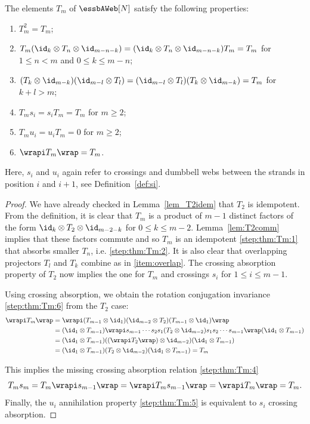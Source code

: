 \begin{theo} \label{thm:Tm}
  The elements $T_m$ of $\essbAWeb[N]$ satisfy the following properties: 
  \begin{enumerate}
  \item $T_m^2=T_m$; \label{step:thm:Tm:1}
  \item $T_m (\id_{k}\otimes T_n\otimes \id_{m-n-k}) =(\id_{k}\otimes T_n\otimes \id_{m-n-k}) T_m = T_m$ for $1\leq n< m$ and $0\leq k\leq m-n$; \label{step:thm:Tm:2}
  \item $(T_k\otimes \id_{m-k})(\id_{m-l}\otimes T_l)= (\id_{m-l}\otimes T_l) (T_k\otimes \id_{m-k})  = T_{m}$ for $k+l> m$; \label{item:overlap} 
\item $T_m s_i= s_i T_m=T_m$ for $m\geq 2$; \label{step:thm:Tm:4}
\item $T_m u_i= u_i T_m=0$ for $m\geq 2$; \label{step:thm:Tm:5}
 \item $\wrapi T_m \wrap=T_m$. \label{step:thm:Tm:6}
  \end{enumerate}
Here, $s_i$ and $u_i$ again refer to crossings and dumbbell webs between the strands in position $i$ and $i+1$, see Definition~\ref{def:si}.
\end{theo}
\begin{proof} We have already checked in Lemma~\ref{lem_T2idem} that $T_2$ is idempotent. From the definition, it is clear that $T_m$ is a product of $m-1$ distinct factors of the form $\id_{k}\otimes T_2 \otimes \id_{m-2-k}$ for $0\leq k\leq m-2$. Lemma~\ref{lem:T2comm} implies that these factors commute and so $T_m$ is an idempotent \eqref{step:thm:Tm:1} that absorbs smaller $T_n$, i.e. \eqref{step:thm:Tm:2}. It is also clear that overlapping projectors $T_l$ and $T_k$ combine as in \eqref{item:overlap}. The crossing absorption property of $T_2$ now implies the one for $T_m$ and crossings $s_i$ for $1\leq i \leq m-1$. 

Using crossing absorption, we obtain the rotation conjugation invariance \eqref{step:thm:Tm:6} from the $T_2$  case:
\begin{align*}
\wrapi T_m \wrap &=\wrapi (T_{m-1}\otimes \id_1)(\id_{m-2}\otimes T_2)(T_{m-1}\otimes \id_1) \wrap \\
&= (\id_1 \otimes T_{m-1})\wrapi s_{m-1}\cdots s_{2}s_{1}(T_2\otimes \id_{m-2})s_{1}s_{2}\cdots s_{m-1} \wrap (\id_1 \otimes T_{m-1})
\\
&= (\id_1 \otimes T_{m-1})((\wrapi T_2 \wrap)\otimes \id_{m-2}) (\id_1 \otimes T_{m-1}) 
\\&= (\id_1 \otimes T_{m-1})( T_2 \otimes \id_{m-2}) (\id_1 \otimes T_{m-1}) = T_{m} 
\end{align*}

This implies the missing crossing absorption relation \eqref{step:thm:Tm:4}
\[T_m s_m= T_m \wrapi s_{m-1} \wrap = \wrapi T_m  s_{m-1} \wrap = \wrapi T_m  \wrap =T_m .\] 
Finally, the $u_i$ annihilation property \eqref{step:thm:Tm:5} is equivalent to $s_i$ crossing absorption.
\end{proof}

